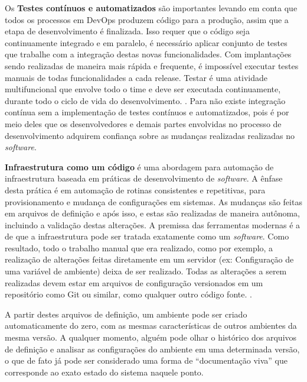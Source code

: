 \documentclass[twoside,english,brazilian]{UNISINOSartigo}
\begin{document}
Os \textbf{Testes contínuos e automatizados} são importantes levando em conta que todos os processos em DevOps produzem código para a produção, assim que a etapa de desenvolvimento é finalizada. Isso requer que o código seja continuamente integrado e em paralelo, é necessário aplicar conjunto de testes que trabalhe com a integração destas novas funcionalidades. Com implantações sendo realizadas de maneira mais rápida e frequente, é impossível executar testes manuais  de todas funcionalidades a cada release. Testar é uma atividade multifuncional que envolve todo o time e deve ser executada continuamente, durante todo o ciclo de vida do desenvolvimento. \cite{Humble2012}.  
Para  não existe integração contínua sem a implementação de testes contínuos e automatizados, pois é por meio deles que os desenvolvedores e demais partes envolvidas no processo de desenvolvimento adquirem confiança sobre as mudanças realizadas realizadas no \textit{software}.

\textbf{Infraestrutura como um código} é uma abordagem para automação de infraestrutura baseada em práticas de desenvolvimento de \textit{software}. A ênfase desta prática é em automação de rotinas consistentes e repetitivas, para provisionamento e mudança de configurações em sistemas. As mudanças são feitas em arquivos de definição e após isso, e estas são realizadas de maneira autônoma, incluindo a validação destas alterações.
A premissa das ferramentas modernas é a de que a infraestrutura pode ser tratada exatamente como um \textit{software}.  Como resultado, todo o trabalho manual que era realizado, como por exemplo, a realização de alterações feitas diretamente em um servidor (ex: Configuração de uma variável de ambiente) deixa de ser realizado. Todas as alterações a serem realizadas devem estar em arquivos de configuração versionados em um repositório como Git ou similar, como qualquer outro código fonte. \citep{Morris2016}.

A partir destes arquivos de definição, um ambiente pode ser criado automaticamente do zero, com as mesmas características de outros ambientes da mesma versão. A qualquer momento, alguém pode olhar o histórico dos arquivos de definição e analisar as configurações do ambiente em uma determinada versão, o que de fato já pode ser considerado uma forma de ``documentação viva'' que corresponde ao exato estado do sistema naquele ponto.
\end{document}
